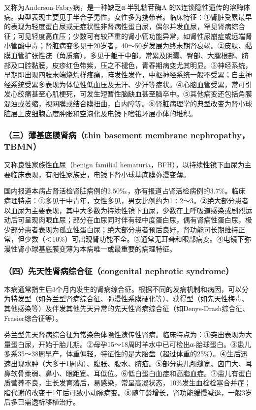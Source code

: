 又称为Anderson-Fabry病，是一种缺乏α-半乳糖苷酶A
的X连锁隐性遗传的溶酶体病。典型表现主要见于半合子男性，女性多为携带者。临床特征：①肾脏受累最早的表现为轻度蛋白尿或无症状性非肾病性蛋白尿，偶尔并发血尿，罕见肾病综合征；可见轻度高血压；少数可有较严重的肾小管功能异常，如肾性尿崩症或远端肾小管酸中毒；肾脏病变多见于20岁者，40～50岁发展为终末期肾衰竭。②皮肤、黏膜血管扩张性疣（角质瘤），多见于躯干中部，常累及阴囊、臀部、大腿根部、脐部及口腔黏膜，皮疹红色带紫，压之不褪色，青春期病变尤其明显。③神经系统，早期即出现四肢末端烧灼样疼痛，阵发性发作，中枢神经系统一般不受累；自主神经系统受累多表现为体位性低血压及无汗、少汗等症状。④心脑血管受累，常可引发心绞痛甚至心肌梗死，可发生短暂性脑缺血甚至脑卒中。⑤其他病变还包括角膜混浊或萎缩，视网膜或结合膜扭曲，白内障等。⑥肾脏病理学的典型改变为肾小球脏层上皮细胞高度肿胀和空泡化及电镜下嗜锇环层小体的堆积。

\subsubsection{（三）薄基底膜肾病（thin basement membrane nephropathy，TBMN）}

又称良性家族性血尿（benign familial
hematuria，BFH），以持续性镜下血尿为主要临床表现，有阳性家族史，电镜下肾小球基底膜弥漫变薄。

国内报道本病占肾活检肾脏病例的2.50‰，亦有报道占肾活检病例的3.7\%。临床病理特点：①多见于中青年，女性多见，男女比例约为1∶2～3。②绝大部分患者以血尿为主要表现，其中大多数为持续性镜下血尿，少数在上呼吸道感染或剧烈运动后可呈现肉眼血尿；部分在血尿同时伴有轻中度蛋白尿，偶有肾病性蛋白尿，极少部分患者表现为孤立性蛋白尿；绝大部分患者预后良好，肾功能可长期维持正常，但少数（＜10\%）可出现肾功能不全。③通常无耳聋和眼部病变。④电镜下弥漫性肾小球基底膜变薄为本病唯一或最重要的病理特征。

\subsubsection{（四）先天性肾病综合征（congenital nephrotic syndrome）}

本病通常指生后3个月内发生的肾病综合征。根据不同的发病机制和病因，可以分为特发型（如芬兰型肾病综合征、弥漫性系膜硬化等）、获得型（如先天性梅毒、其他感染等）及伴发其他先天异常的先天性肾病综合征（如Denys-Drash综合征、Frasier综合征等）。

芬兰型先天肾病综合征为常染色体隐性遗传性肾病。临床特点为：①突出表现为大量蛋白尿，开始于胎儿期。②母孕15～18周时羊水中已可检出α-胎球蛋白。③患儿多系35～38周早产，体重偏轻，特征性的是大胎盘（超过体重的25\%）。④生后迅速出现水肿（大多于1周内）、腹胀、腹水、脐疝。⑤部分患儿颅缝宽、囟门大、耳鼻软骨柔弱、鼻小、眼距宽、耳低位。⑥低白蛋白血症和高脂血症。⑦患儿有蛋白质营养不良，生长发育落后，易感染，常呈高凝状态，10\%发生血栓栓塞合并症；脂代谢的改变于1年后可致小动脉病变。⑧随年龄增长，肾功能缓慢减退，一般3岁后多已需透析移植治疗。


